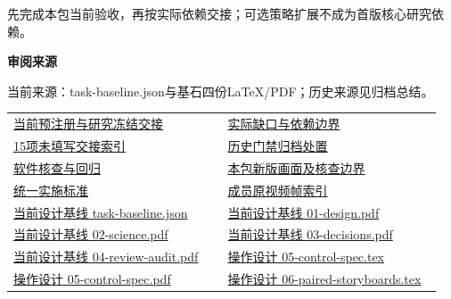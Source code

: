 \documentclass[11pt,a4paper]{article}
\newcommand{\reviewsubsection}[1]{\par\Needspace{4\baselineskip}\vspace{4pt}\begin{center}{\titlelatin\titlecjk\bfseries\fontsize{12}{18}\selectfont #1}\end{center}}
\begin{document}
先完成本包当前验收，再按实际依赖交接；可选策略扩展不成为首版核心研究依赖。


\begin{minipage}{\linewidth}
\reviewsubsection{3.4 审阅来源}
当前来源：task-\allowbreak{}baseline.json与基石四份LaTeX/\allowbreak{}PDF；历史来源见归档总结。


\begingroup\small\setlength{\tabcolsep}{4pt}\begin{tabular}{@{}p{0.48\linewidth}p{0.48\linewidth}@{}}
\href{file:///D:/Agent/srp/agent/tasks/G-03/outputs/current-freeze.md}{当前预注册与研究冻结交接} & \href{file:///D:/Agent/srp/agent/tasks/G-03/outputs/current-freeze.json}{实际缺口与依赖边界}\\[4pt]
\href{file:///D:/Agent/srp/agent/tasks/G-03/outputs/freeze-template.json}{15项未填写交接索引} & \href{file:///D:/Agent/srp/agent/tasks/G-03/archive/README.md}{历史门禁归档处置}\\[4pt]
\href{file:///D:/Agent/srp/agent/tasks/G-03/evidence/verification.json}{软件核查与回归} & \href{file:///D:/Agent/srp/agent/tasks/G-03/outputs/current-implementation-evidence.md}{本包新版画面及核查边界}\\[4pt]
\href{file:///D:/Agent/srp/agent/design/weather/2026-10-08_Storm\%E4\%B8\%8E\%E7\%BA\%AF\%E7\%B2\%92\%E5\%AD\%90\%E5\%8F\%8C\%E7\%8E\%AF\%E5\%AE\%9E\%E6\%96\%BD\%E6\%A0\%87\%E5\%87\%86.md}{统一实施标准} & \href{file:///D:/Agent/srp/human/assets/previews/2026-10-08/member-storm-particle-rings/frame-index.json}{成员原视频帧索引}\\[4pt]
\href{file:///D:/Agent/srp/agent/design/design-foundation-20261008/task-baseline.json}{当前设计基线 task-\allowbreak{}baseline.json} & \href{file:///D:/Agent/srp/agent/design/design-foundation-20261008/01-design.pdf}{当前设计基线 01-\allowbreak{}design.pdf}\\[4pt]
\href{file:///D:/Agent/srp/agent/design/design-foundation-20261008/02-science.pdf}{当前设计基线 02-\allowbreak{}science.pdf} & \href{file:///D:/Agent/srp/agent/design/design-foundation-20261008/03-decisions.pdf}{当前设计基线 03-\allowbreak{}decisions.pdf}\\[4pt]
\href{file:///D:/Agent/srp/agent/design/design-foundation-20261008/04-review-audit.pdf}{当前设计基线 04-\allowbreak{}review-\allowbreak{}audit.pdf} & \href{file:///D:/Agent/srp/agent/design/design-foundation-20261008/05-control-spec.tex}{操作设计 05-\allowbreak{}control-\allowbreak{}spec.tex}\\[4pt]
\href{file:///D:/Agent/srp/agent/design/design-foundation-20261008/05-control-spec.pdf}{操作设计 05-\allowbreak{}control-\allowbreak{}spec.pdf} & \href{file:///D:/Agent/srp/agent/design/design-foundation-20261008/06-paired-storyboards.tex}{操作设计 06-\allowbreak{}paired-\allowbreak{}storyboards.tex}\\[4pt]

\end{tabular}
\end{minipage}
\end{document}
